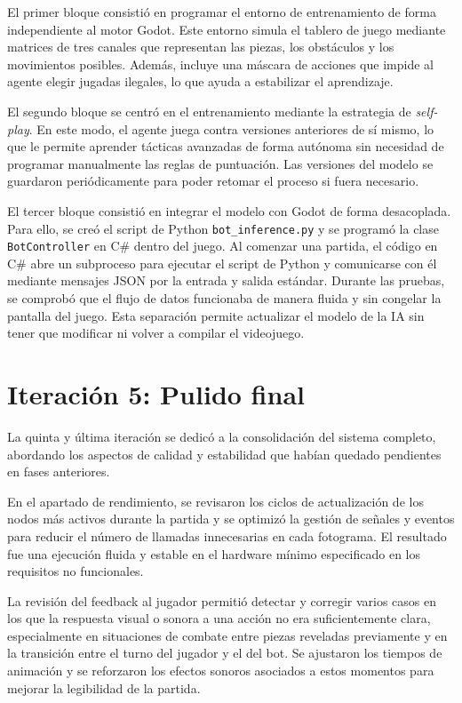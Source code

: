 El primer bloque consistió en programar el entorno de entrenamiento de forma independiente al motor Godot. Este entorno simula el tablero de juego mediante matrices de tres canales que representan las piezas, los obstáculos y los movimientos posibles. Además, incluye una máscara de acciones que impide al agente elegir jugadas ilegales, lo que ayuda a estabilizar el aprendizaje.

El segundo bloque se centró en el entrenamiento mediante la estrategia de \textit{self-play}. En este modo, el agente juega contra versiones anteriores de sí mismo, lo que le permite aprender tácticas avanzadas de forma autónoma sin necesidad de programar manualmente las reglas de puntuación. Las versiones del modelo se guardaron periódicamente para poder retomar el proceso si fuera necesario.

\clearpage

El tercer bloque consistió en integrar el modelo con Godot de forma desacoplada. Para ello, se creó el script de Python \texttt{bot\_inference.py} y se programó la clase \texttt{BotController} en C\# dentro del juego. Al comenzar una partida, el código en C\# abre un subproceso para ejecutar el script de Python y comunicarse con él mediante mensajes JSON por la entrada y salida estándar. Durante las pruebas, se comprobó que el flujo de datos funcionaba de manera fluida y sin congelar la pantalla del juego. Esta separación permite actualizar el modelo de la IA sin tener que modificar ni volver a compilar el videojuego.

\section{Iteración 5: Pulido final}

La quinta y última iteración se dedicó a la consolidación del sistema completo, abordando los aspectos de calidad y estabilidad que habían quedado pendientes en fases anteriores.

En el apartado de rendimiento, se revisaron los ciclos de actualización de los nodos más activos durante la partida y se optimizó la gestión de señales y eventos para reducir el número de llamadas innecesarias en cada fotograma. El resultado fue una ejecución fluida y estable en el hardware mínimo especificado en los requisitos no funcionales.

La revisión del feedback al jugador permitió detectar y corregir varios casos en los que la respuesta visual o sonora a una acción no era suficientemente clara, especialmente en situaciones de combate entre piezas reveladas previamente y en la transición entre el turno del jugador y el del bot. Se ajustaron los tiempos de animación y se reforzaron los efectos sonoros asociados a estos momentos para mejorar la legibilidad de la partida.

